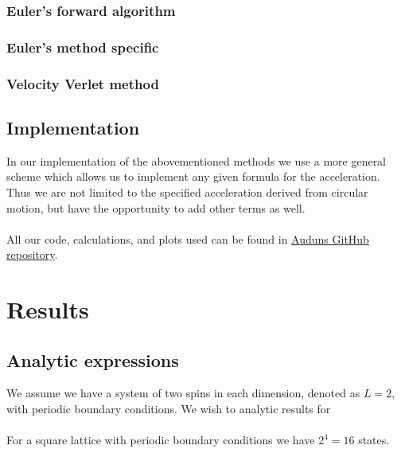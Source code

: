 \documentclass[a4paper, fontsize=11pt]{article}
\begin{document}
\subsubsection{Euler's forward algorithm}


\subsubsection{Euler's method specific}



\subsubsection{Velocity Verlet method}



\subsection{Implementation}

In our implementation of the abovementioned methods we use a more general scheme which allows us to implement any given formula for the acceleration. Thus we are not limited to the specified acceleration derived from circular motion, but have the opportunity to add other terms as well. 


\paragraph{}
All our code, calculations, and plots used can be found in \href{https://github.com/auduntre/FYS4150/tree/master/Project%203}{Auduns GitHub repository}.

\section{Results}


\subsection{Analytic expressions}
We assume we have a system of two spins in each dimension, denoted as $L = 2$, with periodic boundary conditions. We wish to analytic results for 

\paragraph{}
For a square lattice with periodic boundary conditions we have $2^4 = 16$ states. \cite{H-Jensen}
\end{document}

